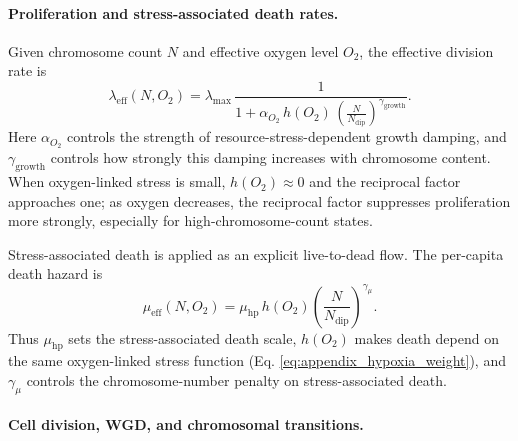 \documentclass[11pt]{article}
\begin{document}
\paragraph{Proliferation and stress-associated death rates.}

Given chromosome count $N$ and effective oxygen level $O_2$, the effective division rate is
\begin{equation}
\lambda_{\mathrm{eff}}(N,O_2)
=
\lambda_{\max}\,
\frac{1}{1+\alpha_{O_2}\,h(O_2)\,
\left(\frac{N}{N_{\mathrm{dip}}}\right)^{\gamma_{\mathrm{growth}}}}.
\label{eq:appendix_lambda_eff_soft}
\end{equation}
Here $\alpha_{O_2}$ controls the strength of resource-stress-dependent growth damping, and $\gamma_{\mathrm{growth}}$ controls how strongly this damping increases with chromosome content. When oxygen-linked stress is small, $h(O_2)\approx 0$ and the reciprocal factor approaches one; as oxygen decreases, the reciprocal factor suppresses proliferation more strongly, especially for high-chromosome-count states.

Stress-associated death is applied as an explicit live-to-dead flow. The per-capita death hazard is
\begin{equation}
\mu_{\mathrm{eff}}(N,O_2)
=
\mu_{\mathrm{hp}}\,
h(O_2)
\left(\frac{N}{N_{\mathrm{dip}}}\right)^{\gamma_\mu}.
\label{eq:appendix_mu_soft}
\end{equation}
Thus $\mu_{\mathrm{hp}}$ sets the stress-associated death scale, $h(O_2)$ makes death depend on the same oxygen-linked stress function (Eq. \eqref{eq:appendix_hypoxia_weight}), and $\gamma_\mu$ controls the chromosome-number penalty on stress-associated death.

\paragraph{Cell division, WGD, and chromosomal transitions.}
\end{document}
